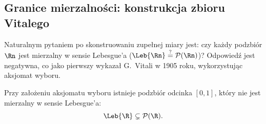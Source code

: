 \subsection{Granice mierzalności: konstrukcja zbioru Vitalego}\label{sec:vitali}

Naturalnym pytaniem po skonstruowaniu zupełnej miary jest: czy każdy podzbiór $\Rn$ jest mierzalny w sensie Lebesgue'a ($\Leb{\Rn} \stackrel{?}{=} \mathcal{P}(\Rn)$)? Odpowiedź jest negatywna, co jako pierwszy wykazał G.~Vitali w 1905 roku, wykorzystując aksjomat wyboru.

\begin{tw}\label{tw:vitali}
    Przy założeniu aksjomatu wyboru istnieje podzbiór odcinka $[0, 1]$, który nie jest mierzalny w sensie Lebesgue'a:
    \begin{equation*}
        \Leb{\R} \subsetneq \mathcal{P}(\R).
    \end{equation*}
\end{tw}

